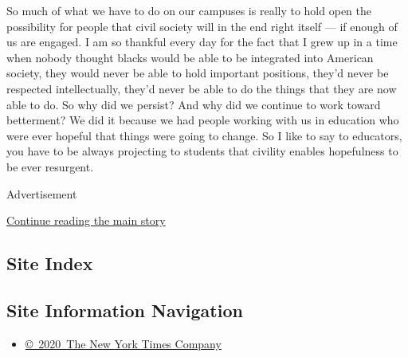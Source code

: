 So much of what we have to do on our campuses is really to hold open the
possibility for people that civil society will in the end right itself
--- if enough of us are engaged. I am so thankful every day for the fact
that I grew up in a time when nobody thought blacks would be able to be
integrated into American society, they would never be able to hold
important positions, they'd never be respected intellectually, they'd
never be able to do the things that they are now able to do. So why did
we persist? And why did we continue to work toward betterment? We did it
because we had people working with us in education who were ever hopeful
that things were going to change. So I like to say to educators, you
have to be always projecting to students that civility enables
hopefulness to be ever resurgent.

Advertisement

\protect\hyperlink{after-bottom}{Continue reading the main story}

\hypertarget{site-index}{%
\subsection{Site Index}\label{site-index}}

\hypertarget{site-information-navigation}{%
\subsection{Site Information
Navigation}\label{site-information-navigation}}

\begin{itemize}
\tightlist
\item
  \href{https://help.nytimes3xbfgragh.onion/hc/en-us/articles/115014792127-Copyright-notice}{©~2020~The
  New York Times Company}
\end{itemize}

